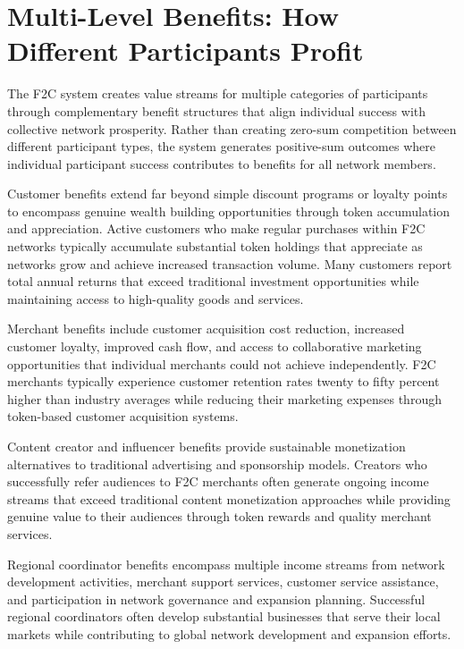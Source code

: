 \documentclass[
  Letterpaper,
]{scrbook}
\begin{document}
\section{Multi-Level Benefits: How Different Participants
Profit}\label{multi-level-benefits-how-different-participants-profit}

The F2C system creates value streams for multiple categories of
participants through complementary benefit structures that align
individual success with collective network prosperity. Rather than
creating zero-sum competition between different participant types, the
system generates positive-sum outcomes where individual participant
success contributes to benefits for all network members.

Customer benefits extend far beyond simple discount programs or loyalty
points to encompass genuine wealth building opportunities through token
accumulation and appreciation. Active customers who make regular
purchases within F2C networks typically accumulate substantial token
holdings that appreciate as networks grow and achieve increased
transaction volume. Many customers report total annual returns that
exceed traditional investment opportunities while maintaining access to
high-quality goods and services.

Merchant benefits include customer acquisition cost reduction, increased
customer loyalty, improved cash flow, and access to collaborative
marketing opportunities that individual merchants could not achieve
independently. F2C merchants typically experience customer retention
rates twenty to fifty percent higher than industry averages while
reducing their marketing expenses through token-based customer
acquisition systems.

Content creator and influencer benefits provide sustainable monetization
alternatives to traditional advertising and sponsorship models. Creators
who successfully refer audiences to F2C merchants often generate ongoing
income streams that exceed traditional content monetization approaches
while providing genuine value to their audiences through token rewards
and quality merchant services.

Regional coordinator benefits encompass multiple income streams from
network development activities, merchant support services, customer
service assistance, and participation in network governance and
expansion planning. Successful regional coordinators often develop
substantial businesses that serve their local markets while contributing
to global network development and expansion efforts.
\end{document}
